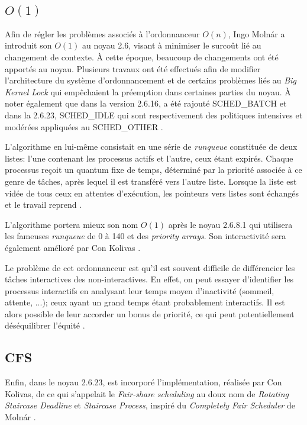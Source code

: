 \documentclass[letterpaper]{article}
\begin{document}
\subsection{$O(1)$}

Afin de régler les problèmes associés à l'ordonnanceur $O(n)$, Ingo Molnár a introduit son $O(1)$ au noyau 2.6, visant à minimiser le surcoût lié au changement de contexte. À cette époque, beaucoup de changements ont été apportés au noyau. Plusieurs travaux ont été effectués afin de modifier l'architecture du système d'ordonnancement et de certains problèmes liés au \textit{Big Kernel Lock} \citep{bryant2003linux} qui empêchaient la préemption dans certaines parties du noyau. À noter également que dans la version 2.6.16, a été rajouté SCHED\_BATCH et dans la 2.6.23, SCHED\_IDLE qui sont respectivement des politiques intensives et modérées appliquées au SCHED\_OTHER \citep{Pabla:2009:CFS:1594371.1594375}. 

L'algorithme en lui-même consistait en une série de \textit{runqueue} constituée de deux listes: l'une contenant les processus actifs et l'autre, ceux étant expirés. Chaque processus reçoit un quantum fixe de temps, déterminé par la priorité associée à ce genre de tâches, après lequel il est transféré vers l'autre liste. Lorsque la liste est vidée de tous ceux en attentes d'exécution, les pointeurs vers listes sont échangés et le travail reprend \citep{Love:2010:LKD:1855096}.

L'algorithme portera mieux son nom $O(1)$ après le noyau 2.6.8.1 qui utilisera les fameuses \textit{runqueue} de 0 à 140 et des \textit{priority arrays}. Son interactivité sera également amélioré par Con Kolivas \citep{Aas05understandingthe}.

Le problème de cet ordonnanceur est qu'il est souvent difficile de différencier les tâches interactives des non-interactives. En effet, on peut essayer d'identifier les processus interactifs en analysant leur temps moyen d'inactivité (sommeil, attente, ...); ceux ayant un grand temps étant probablement interactifs. Il est alors possible de leur accorder un bonus de priorité, ce qui peut potentiellement déséquilibrer l'équité \citep{4631872}.

\subsection{CFS}

Enfin, dans le noyau 2.6.23, est incorporé l'implémentation, réalisée par Con Kolivas, de ce qui s'appelait le \textit{Fair-share scheduling} au doux nom de \textit{Rotating Staircase Deadline} et \textit{Staircase Process}, inspiré du \textit{Completely Fair Scheduler} de Molnár \citep{PATCHCFS}.
\end{document}
